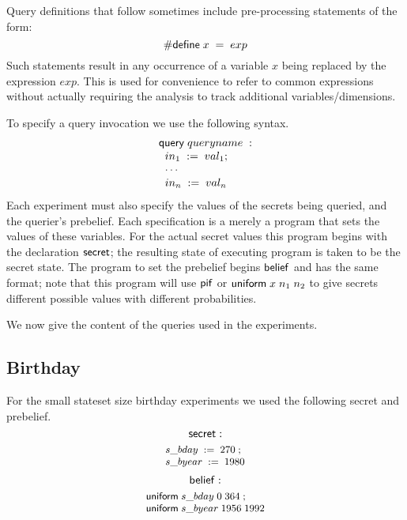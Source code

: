 Query definitions that follow sometimes include
pre-processing statements of the form:
$$ \mathsf{\#define}\;{x}\;=\;{exp} $$
Such statements result in any occurrence of a variable $ x $ being
replaced by the expression $exp$. This is used for convenience to
refer to common expressions without actually requiring the analysis to
track additional variables/dimensions.

To specify a query invocation we use the following syntax.
$$
\begin{array}{l}
\mathsf{query} \; queryname \; : \\
\;\; in_1 \; := \; val_1; \\
\;\; \cdots \\
\;\; in_n \; := \; val_n
\end{array}
$$
Each experiment must also specify the values of the secrets being
queried, and the querier's prebelief.  Each specification is a merely
a program that sets the values of these variables.  For the actual
secret values this program begins with the declaration $ \mathsf{secret}$;
the resulting state of executing program is taken to be the secret
state.  The program to set the prebelief begins $ \mathsf{belief}$ and has
the same format; note that this program will use $\mathsf{pif}$ or
$\mathsf{uniform}\;{x}\;{n_1}\;n_2$ to give secrets different possible values
with different probabilities.  

We now give the content of the queries used in the experiments.

\subsection{Birthday}
For the small stateset size birthday experiments we used the
following secret and prebelief.
$$ \mathsf{secret}: $$
\begin{displaymath}{\small
\begin{array}{l}
  {s\text{\_}bday}\;:=\;{270}\; ;\\
  {s\text{\_}byear}\;:=\;{1980}\\
\end{array}
}\end{displaymath}
$$ \mathsf{belief}: $$
\begin{displaymath}{\small
\begin{array}{l}
  \mathsf{uniform}\;{s\text{\_}bday}\;{0}\;364\; ;\\
  \mathsf{uniform}\;{s\text{\_}byear}\;{1956}\;1992\\
\end{array}
}\end{displaymath}

